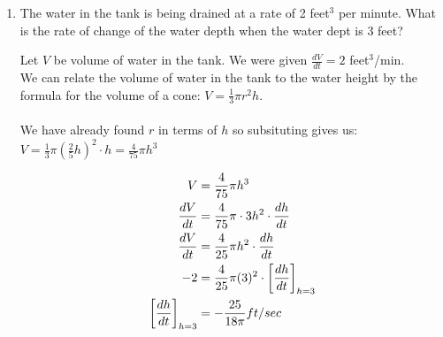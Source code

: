 \documentclass[nooutcomes]{ximera}
\begin{document}
\begin{problem}
\begin{enumerate}
	\item The water in the tank is being drained at a rate of 2 feet$^3$ per minute.  What is the rate of change of the water depth when the water dept is 3 feet?

	\begin{freeResponse}
	Let $V$ be volume of water in the tank.  We were given $\frac{dV}{dt}=2$ feet$^3$/min. \\
	We can relate the volume of water in the tank to the water height by the formula for the volume of a cone: $V=\frac{1}{3}\pi r^2 h$. \\\\
	We have already found $r$ in terms of $h$ so subsituting gives us:  $V=\frac{1}{3}\pi \left(\frac{2}{5}h\right)^2\cdot h=\frac{4}{75}\pi h^3$
	
	\begin{align*}
	V&=\frac{4}{75}\pi h^3\\
	\frac{dV}{dt}&=\frac{4}{75}\pi \cdot 3h^2 \cdot \frac{dh}{dt} \\
	\frac{dV}{dt}&=\frac{4}{25}\pi h^2 \cdot \frac{dh}{dt} \\
	-2&=\frac{4}{25}\pi (3)^2 \cdot \bigg[ \frac{dh}{dt} \bigg]_{h=3} \\
	\bigg[ \frac{dh}{dt} \bigg]_{h=3}&=-\frac{25}{18 \pi} ft/sec
	\end{align*}


\end{freeResponse}
\end{enumerate}
\end{problem}
\end{document}
